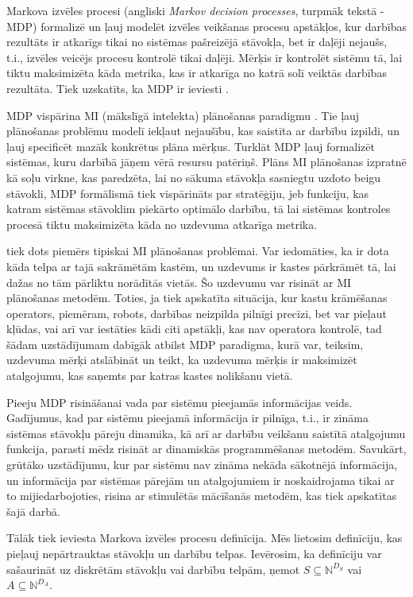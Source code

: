 \documentclass{ludis} %
\begin{document}
Markova izvēles procesi (angliski \textit{Markov decision processes}, turpmāk
tekstā - MDP) formalizē un ļauj modelēt izvēles veikšanas procesu apstākļos, kur
darbības rezultāts ir atkarīgs tikai no sistēmas pašreizējā stāvokļa, bet ir
daļēji nejaušs, t.i., izvēles veicējs procesu kontrolē tikai daļēji. Mērķis ir
kontrolēt sistēmu tā, lai tiktu maksimizēta kāda metrika, kas ir atkarīga no
katrā solī veiktās darbības rezultāta. Tiek uzskatīts, ka MDP ir ieviesti
\autocite{Bel}.

MDP vispārina MI (mākslīgā intelekta) plānošanas paradigmu
\autocite{Hendler1990ai}. Tie ļauj plānošanas problēmu modelī iekļaut nejaušību,
kas saistīta ar darbību izpildi, un ļauj specificēt mazāk konkrētus plāna
mērķus. Turklāt MDP ļauj formalizēt sistēmas, kuru darbībā jāņem vērā resursu
patēriņš. Plāns MI plānošanas izpratnē kā soļu virkne, kas paredzēta, lai no
sākuma stāvokļa sasniegtu uzdoto beigu stāvokli, MDP formālismā tiek vispārināts
par stratēģiju, jeb funkciju, kas katram sistēmas stāvoklim piekārto optimālo
darbību, tā lai sistēmas kontroles procesā tiktu maksimizēta kāda no uzdevuma
atkarīga metrika.

\autocite{Otterlo} tiek dots piemērs tipiskai MI plānošanas problēmai. Var
iedomāties, ka ir dota kāda telpa ar tajā sakrāmētām kastēm, un uzdevums ir
kastes pārkrāmēt tā, lai dažas no tām pārliktu norādītās vietās. Šo uzdevumu var
risināt ar MI plānošanas metodēm. Toties, ja tiek apskatīta situācija, kur kastu
krāmēšanas operators, piemēram, robots, darbības neizpilda pilnīgi precīzi, bet
var pieļaut kļūdas, vai arī var iestāties kādi citi apstākļi, kas nav operatora
kontrolē, tad šādam uzstādījumam dabīgāk atbilst MDP paradigma, kurā var,
teiksim, uzdevuma mērķi atslābināt un teikt, ka uzdevuma mērķis ir maksimizēt
atalgojumu, kas saņemts par katras kastes nolikšanu vietā.

Pieeju MDP risināšanai vada par sistēmu pieejamās informācijas veids. Gadījumus,
kad par sistēmu pieejamā informācija ir pilnīga, t.i., ir zināma sistēmas
stāvokļu pāreju dinamika, kā arī ar darbību veikšanu saistītā atalgojumu
funkcija, parasti mēdz risināt ar dinamiskās programmēšanas metodēm. Savukārt,
grūtāko uzstādījumu, kur par sistēmu nav zināma nekāda sākotnējā informācija, un
informācija par sistēmas pārejām un atalgojumiem ir noskaidrojama tikai ar to
mijiedarbojoties, risina ar stimulētās mācīšanās metodēm, kas tiek apskatītas
šajā darbā.

Tālāk tiek ieviesta Markova izvēles procesu definīcija. Mēs lietosim definīciju,
kas pieļauj nepārtrauktas stāvokļu un darbību telpas. Ievērosim, ka definīciju
var sašaurināt uz diskrētām stāvokļu vai darbību telpām, ņemot $S \subseteq
\mathbb{N}^{D_S}$ vai $A \subseteq \mathbb{N}^{D_A}$.
\end{document}
